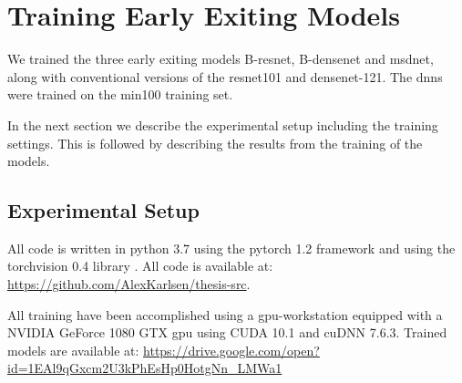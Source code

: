 
\section{Training Early Exiting Models}

We trained the three early exiting models B-\gls{resnet}, B-\gls{densenet} and \gls{msdnet}, along with conventional versions of the \gls{resnet}101 and \gls{densenet}-121. The \gls{dnn}s were trained on the \gls{min100} training set.

In the next section we describe the experimental setup including the training settings. This is followed by describing the results from the training of the models.

\subsection{Experimental Setup}

All code is written in \gls{python} 3.7 \cite{van_rossum_python_1995} using the \gls{pytorch} 1.2
framework \cite{paszke_automatic_2017} and using the \gls{torchvision} 0.4 library \cite{marcel_torchvision_2010}. All code is available at:
{\color{sns-grey}\url{https://github.com/AlexKarlsen/thesis-src}}. 

All training have been accomplished using a \gls{gpu}-workstation equipped with a NVIDIA GeForce 1080 GTX \gls{gpu} using CUDA 10.1 and cuDNN 7.6.3. Trained models are available at: {\color{sns-grey}\url{https://drive.google.com/open?id=1EAl9qGxcm2U3kPhEsHp0HotgNn_LMWa1}} 



